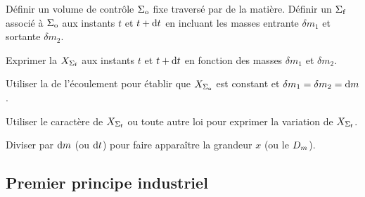 \documentclass[12pt,fancy]{cours}
\begin{document}
\begin{methode}
  \item	Définir un volume de contrôle $\Sigma_{\rm o}$ fixe traversé par de la matière. Définir un  $\Sigma_{\rm f}$ associé à $\Sigma_{\rm o}$ aux instants $t$ et $t+\mathrm{d} t$ en incluant les masses entrante $\delta m_1$ et sortante $\delta m_2$.
  \item Exprimer la  $X_{\Sigma_{\rm f}}$ aux instants $t$ et $t+\mathrm{d} t$ en fonction des masses $\delta m_1$ et $\delta m_2$.
  \item Utiliser la  de l'écoulement pour établir que $X_{\Sigma_{\rm o}}$ est constant et $\delta m_1 = \delta m_2 = \mathrm{d} m$.
  \item Utiliser le caractère  de $X_{\rm \Sigma_{\rm f}}$ ou toute autre loi pour exprimer la variation de $X_{\rm \Sigma_{\rm f}}$.
  \item Diviser par $\mathrm{d} m$ (ou $\mathrm{d} t$)  pour faire apparaître la grandeur  $x$ (ou le  $D_m$). 
\end{methode}

\subsection{Premier principe industriel}
\end{document}
